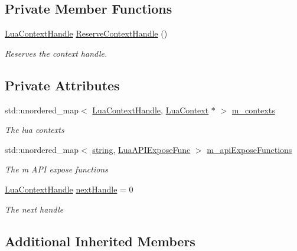 \subsection*{Private Member Functions}
\begin{DoxyCompactItemize}
\item 
\hyperlink{_lua_context_8h_a2ffcc2d3ed21165072a1d7b61259bf14}{Lua\+Context\+Handle} \hyperlink{class_lua_manager_a0e01a877be1de2604b4f9cd8ce9f4ac4}{Reserve\+Context\+Handle} ()
\begin{DoxyCompactList}\small\item\em Reserves the context handle. \end{DoxyCompactList}\end{DoxyCompactItemize}
\subsection*{Private Attributes}
\begin{DoxyCompactItemize}
\item 
std\+::unordered\+\_\+map$<$ \hyperlink{_lua_context_8h_a2ffcc2d3ed21165072a1d7b61259bf14}{Lua\+Context\+Handle}, \hyperlink{class_lua_context}{Lua\+Context} $\ast$ $>$ \hyperlink{class_lua_manager_a38776ab77e2724c0ea549be44087ab98}{m\+\_\+contexts}
\begin{DoxyCompactList}\small\item\em The lua contexts \end{DoxyCompactList}\item 
std\+::unordered\+\_\+map$<$ \hyperlink{_types_8h_ad453f9f71ce1f9153fb748d6bb25e454}{string}, \hyperlink{_lua_a_p_i_8h_a696c6141f695520faf1eb927730bd123}{Lua\+A\+P\+I\+Expose\+Func} $>$ \hyperlink{class_lua_manager_a4c7e50cd257b5c5317ca29763cdbd182}{m\+\_\+api\+Expose\+Functions}
\begin{DoxyCompactList}\small\item\em The m A\+PI expose functions \end{DoxyCompactList}\item 
\hyperlink{_lua_context_8h_a2ffcc2d3ed21165072a1d7b61259bf14}{Lua\+Context\+Handle} \hyperlink{class_lua_manager_a62ecf686a07cbe20f7976e9b29ea4daa}{next\+Handle} = 0
\begin{DoxyCompactList}\small\item\em The next handle \end{DoxyCompactList}\end{DoxyCompactItemize}
\subsection*{Additional Inherited Members}


